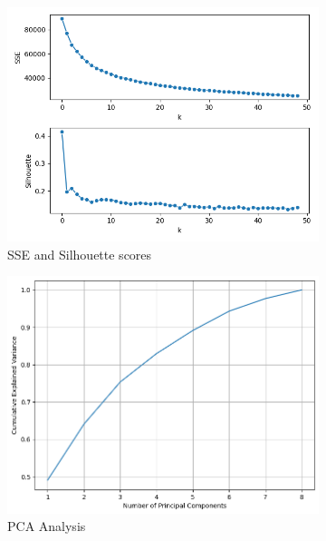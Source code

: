 \begin{figure}[h]
    \centering
    \begin{subfigure}[b]{0.3\textwidth}
        \centering
        \includegraphics[width=\textwidth]{plots/sse_silh_kmeans.png}
        \caption{SSE and Silhouette scores}
        \label{fig:sse_silh_kmeans}
    \end{subfigure}
    \hfill
    \begin{subfigure}[b]{0.3\textwidth}
        \centering
        \includegraphics[width=\textwidth]{plots/pca_kmeans.png}
        \caption{PCA Analysis}
        \label{fig:pca_kmeans}
    \end{subfigure}
    \hfill
    \begin{subfigure}[b]{0.3\textwidth}

\end{subfigure}
\end{figure}
